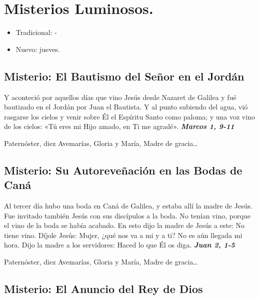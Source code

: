\documentclass[./rosary.tex]{subfiles}
\newcounter{lux-counter}
\begin{document}
\section*{Misterios Luminosos.}
\begin{itemize}
      \item Tradicional: -
      \item Nuevo: jueves.
\end{itemize}

\subsection*{ Misterio: El Bautismo del Señor en el Jordán}

Y aconteció por aquellos días que vino Jesús desde Nazaret de Galilea y fué bautizado en el Jordán por Juan el Bautista. 
Y al punto subiendo del agua, vió rasgarse los cielos y venir sobre Él el Espíritu Santo como paloma; 
y una voz vino de los cielos: «Tú eres mi Hijo amado, en Ti me agradé». 
\textbf{\emph{Marcos 1, 9-11}}

\begin{center}
      Paternóster, diez Avemarías, Gloria y María, Madre de gracia{\ldots}
\end{center}

\bigskip

\subsection*{ Misterio: Su Autoreveñación en las Bodas de Caná}

Al tercer día hubo una boda en Caná de Galilea, y estaba allí la madre de Jesús. Fue invitado también Jesús con sus discípulos a la boda. 
No tenían vino, porque el vino de la boda se había acabado. En esto dijo la madre de Jesús a este: No tiene vino. 
Díjole Jesús: Mujer, ¿qué nos va a mi y a ti? No es aún llegada mi hora. Dijo la madre a los servidores: Haced lo que Él os diga. 
\textbf{\emph{Juan 2, 1-5}}

\begin{center}
      Paternóster, diez Avemarías, Gloria y María, Madre de gracia{\ldots}
\end{center}

\bigskip

\subsection*{ Misterio: El Anuncio del Rey de Dios}
\end{document}
